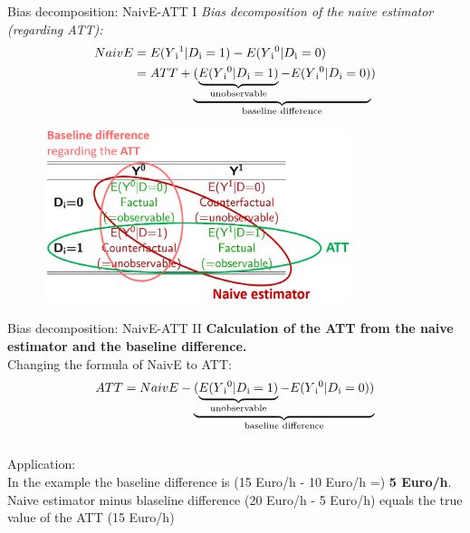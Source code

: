 \documentclass{beamer}\usepackage[]{graphicx}\usepackage[]{color}
\begin{document}
\begin{frame}{Bias decomposition: NaivE-ATT I}
\textit{Bias decomposition of the naive estimator (regarding ATT):}
\begin{align*}
NaivE &= E(Y\textsubscript{i}\textsuperscript{1}\vert D\textsubscript{i}=1)-E(Y\textsubscript{i}\textsuperscript{0} \vert D\textsubscript{i}=0) \\
&= ATT + \underbrace{(\underbrace{E(Y\textsubscript{i}\textsuperscript{0} \vert D\textsubscript{i}=1)}_\text{unobservable} - E(Y\textsubscript{i}\textsuperscript{0} \vert D\textsubscript{i}=0)}_\text{baseline difference})
\end{align*}
\begin{figure}
\centering
\includegraphics[width=0.8\textwidth]{Graphics/Naive_ATT_Baseline.png}
\end{figure}
\end{frame}

\begin{frame}{Bias decomposition: NaivE-ATT II}
\textbf{Calculation of the ATT from the naive estimator and the baseline difference.}
\\[1em]
Changing the formula of NaivE to ATT: \\
\begin{align*}
ATT = NaivE - \underbrace{(\underbrace{E(Y\textsubscript{i}\textsuperscript{0} \vert D\textsubscript{i}=1)}_\text{unobservable}- E(Y\textsubscript{i}\textsuperscript{0} \vert D\textsubscript{i}=0))}_\text{baseline difference}
\end{align*}
\\[1em]
Application:\\
In the example the baseline difference is (15 Euro/h - 10 Euro/h =) \textbf{5 Euro/h}. Naive estimator minus blaseline difference (20 Euro/h - 5 Euro/h) equals the true value of the ATT (15 Euro/h)
\end{frame}
\end{document}
